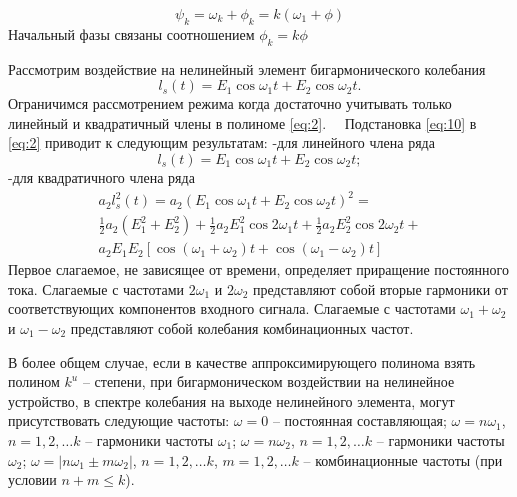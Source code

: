 \begin{equation*}
\psi_k=\omega_k+\phi_k=k(\omega_1+\phi)
\end{equation*}
Начальный фазы связаны соотношением $\phi_k=k\phi$

Рассмотрим воздействие на нелинейный элемент бигармонического колебания
\begin{equation}
l_s(t)=E_1\cos\omega_1t+E_2\cos\omega_2t.
\label{eq:10}
\end{equation}
Ограничимся рассмотрением режима когда достаточно учитывать только линейный и квадратичный члены в полиноме \eqref{eq:2}. 
Подстановка \eqref{eq:10} в \eqref{eq:2} приводит к следующим результатам:
-для линейного члена ряда 
\begin{equation}
l_s(t)=E_1\cos\omega_1t+E_2\cos\omega_2t;
\label{eq:11}
\end{equation}
-для квадратичного члена ряда 
\begin{equation}
\begin{split}
a_2l_s^2(t)=a_2(E_1\cos\omega_1t+E_2\cos\omega_2t)^2 = \\
\frac{1}{2}a_2(E_1^2+E_2^2)+\frac{1}{2}a_2E_1^2\cos2\omega_1t+\frac{1}{2}a_2E_2^2\cos2\omega_2t+\\
a_2E_1E_2[\cos(\omega_1+\omega_2)t+\cos(\omega_1-\omega_2)t]
\label{eq:12}
\end{split}
\end{equation}
Первое слагаемое, не зависящее от времени, определяет приращение постоянного тока. Слагаемые с частотами $2\omega_1$ и $2\omega_2$ представляют собой вторые гармоники от соответствующих компонентов входного сигнала. Слагаемые с частотами $\omega_1+\omega_2$ и $\omega_1-\omega_2$ представляют собой колебания комбинационных частот.

В более общем случае, если в качестве аппроксимирующего полинома взять полином $k^u$ -- степени, при бигармоническом воздействии на нелинейное устройство, в спектре колебания на выходе нелинейного элемента, могут присутствовать следующие частоты:
$\omega=0$ -- постоянная составляющая; $\omega=n\omega_1$, $n=1,2,\ldots k$ -- гармоники частоты $\omega_1$; $\omega=n\omega_2$, $n=1,2,\ldots k$ -- гармоники частоты $\omega_2$; $\omega=|n\omega_1\pm m\omega_2|$, $n=1,2,\ldots k$, $m=1,2,\ldots k$ -- комбинационные частоты (при условии $n+m\leq k$).

